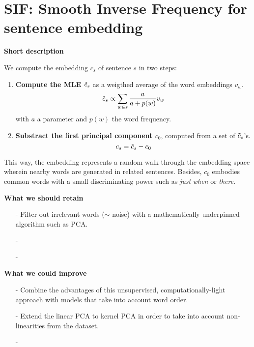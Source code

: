 \setcounter{page}{1}
\newpage
\section{SIF: Smooth Inverse Frequency for sentence embedding}


\textbf{Short description}

We compute the embedding $c_s$ of sentence $s$ in two steps:
\begin{enumerate}[topsep=0pt, itemsep=0pt]
    \item \textbf{Compute the MLE $\Tilde{c}_s$} as a weigthed average of the word embeddings $v_w$.
    \begin{equation*}
        \Tilde{c}_s \propto \sum_{w \in s} \dfrac{a}{a + p(w)} v_w
    \end{equation*}
    with $a$ a parameter and $p(w)$ the word frequency.
        
    \item \textbf{Substract the first principal component $c_0$}, computed from a set of $\Tilde{c}_s$'s.
    \begin{equation*}
        c_s = \Tilde{c}_s - c_0
    \end{equation*}
        
\end{enumerate}

This way, the embedding represents a random walk through the embedding space wherein nearby words are generated in related sentences.
Besides, $c_0$ embodies common words with a small discriminating power such as \textit{just} \textit{when} or \textit{there}.


    

\textbf{What we should retain}

\begin{enumerate}[topsep = 0pt, itemsep = 0pt]
    \item[-] Filter out irrelevant words ($\sim$ noise) with a mathematically underpinned algorithm such as PCA.
    
    \item[-] 
    
    \item[-]
    
\end{enumerate}


\textbf{What we could improve}

\begin{enumerate}[topsep = 0pt, itemsep = 0pt]
    \item[-] Combine the advantages of this unsupervised, computationally-light approach with models that take into account word order.
    
    \item[-] Extend the linear PCA to kernel PCA in order to take into account non-linearities from the dataset.
    
    \item[-]
    
\end{enumerate}


